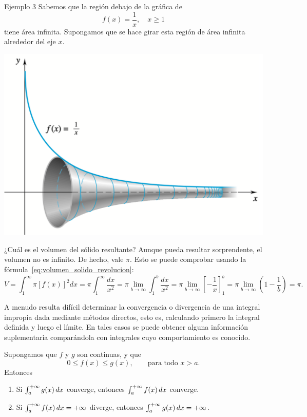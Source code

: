 \begin{example}
  Ejemplo 3 Sabemos que la región debajo de la gráfica de 
\[
f(x) = \frac{1}{x}, \quad x \geq 1
\]
tiene área infinita. Supongamos que se hace girar esta región de área infinita alrededor del eje $x$.

\centerline{\includegraphics[width=.8\textwidth]{pics/revolucion-1-sobre-x.png}}

¿Cuál es el volumen del sólido resultante? Aunque pueda resultar sorprendente, el volumen no es infinito. De hecho, vale $\pi$. Esto se puede comprobar usando la fórmula~\eqref{eq:volumen_solido_revolucion}:
\[
V = \int_1^\infty \pi [f(x)]^2 dx = \pi \int_1^\infty \frac{dx}{x^2} = \pi \lim_{b \to \infty} \int_1^b \frac{dx}{x^2} = \pi \lim_{b \to \infty} \left[-\frac{1}{x}\right]_1^b = \pi \lim_{b \to \infty} \left(1 - \frac{1}{b}\right) = \pi.
\]
\end{example}

A menudo resulta difícil determinar la convergencia o divergencia de una integral impropia
dada mediante métodos directos, esto es, calculando primero la integral definida y luego el límite. En tales casos se puede obtener alguna información suplementaria comparándola con integrales cuyo comportamiento es conocido.

\begin{proposition}
  Supongamos que $f$ y $g$ son continuas, y que 
  \[
  0 \le f(x) \le g(x),\qquad\text{para todo $x>a$.}
  \]
  Entonces
  \begin{enumerate}
    \item Si $\int_a^{+\infty} g(x) \,dx$ converge, entonces $\int_a^{+\infty} f(x) \,dx$ converge.
    \item Si $\int_a^{+\infty} f(x) \,dx=+\infty$ diverge, entonces $\int_a^{+\infty} g(x) \,dx=+\infty$.
  \end{enumerate}
\end{proposition}

